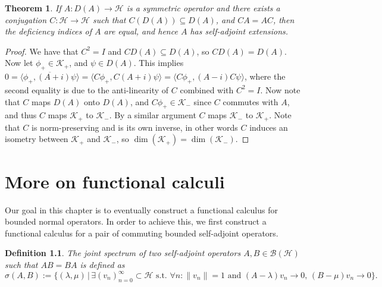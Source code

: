 \documentclass[12pt,oneside]{report}
\newtheorem{thm}{Theorem}[chapter]
\newtheorem{defn}[thm]{Definition}
\begin{document}
\begin{thm}\label{vonNeumann}
    If $A: D(A) \to \mathscr{H}$ is a symmetric operator and there exists a conjugation $C: \mathscr{H} \to \mathscr{H}$ such that $C(D(A)) \subseteq D(A)$, and $CA = AC$, then the deficiency indices of $A$ are equal, and hence $A$ has self-adjoint extensions.
\end{thm}
\begin{proof}
     We have that $C^{2} = I$ and $CD(A) \subseteq D(A)$, so $CD(A) = D(A)$. Now let $\phi_{+} \in \mathscr{K}_{+}$, and $\psi \in D(A)$. This implies $0 = \overline{\langle \phi_{+}, (A + i) \psi \rangle} = \langle C\phi_{+}, C(A+i)\psi \rangle = \langle C\phi_{+}, (A-i)C\psi \rangle$, where the second equality is due to the anti-linearity of $C$ combined with $C^{2} = I$. Now note that $C$ maps $D(A)$ onto $D(A)$, and $C\phi_{+} \in \mathscr{K}_{-}$ since $C$ commutes with $A$, and thus $C$ maps $\mathscr{K}_{+}$ to $\mathscr{K}_{-}$. By a similar argument $C$ maps $\mathscr{K}_{-}$ to $\mathscr{K}_{+}$. Note that $C$ is norm-preserving and is its own inverse, in other words $C$ induces an isometry between $\mathscr{K}_{+}$ and $\mathscr{K}_{-}$, so $\dim(\mathscr{K}_{+}) = \dim(\mathscr{K}_{-})$.
\end{proof}

\chapter{More on functional calculi}

Our goal in this chapter is to eventually construct a functional calculus for bounded normal operators. In order to achieve this, we first construct a functional calculus for a pair of commuting bounded self-adjoint operators.

\begin{defn}
    The joint spectrum of two self-adjoint operators $A,B \in \mathscr{B}(\mathscr{H})$ such that $AB = BA$ is defined as $\sigma(A,B) := \{ (\lambda,\mu) \, | \, \exists (v_{n})_{n=0}^{\infty} \subset \mathscr{H} \text{ s.t. } \forall n: \|v_{n}\| = 1 \text{ and } (A - \lambda)v_{n} \to 0, \, (B - \mu)v_{n} \to 0 \}.$
\end{defn}
\end{document}
